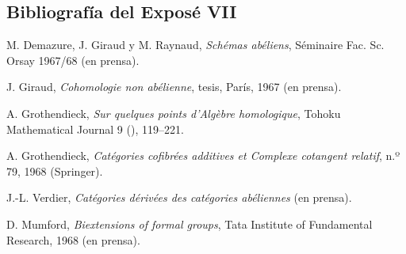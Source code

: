 \subsection*{Bibliografía del Exposé VII}

\begin{enumerate}[label={[\arabic*]}]
\item M. Demazure, J. Giraud y M. Raynaud,
\emph{Schémas abéliens}, Séminaire Fac. Sc. Orsay 1967/68 (en prensa).
\item J. Giraud, \emph{Cohomologie non abélienne}, tesis, París,
1967 (en prensa).
\item A. Grothendieck, \emph{Sur quelques points d'Algèbre
homologique}, Tohoku Mathematical Journal 9 (), 119--221.
\item A. Grothendieck, \emph{Catégories cofibrées additives et
Complexe cotangent relatif},
 n.º 79, 1968
(Springer).
\item J.-L. Verdier, \emph{Catégories dérivées des catégories
abéliennes} (en prensa).
\item D. Mumford, \emph{Biextensions of formal groups}, Tata
Institute of Fundamental Research, 1968 (en prensa).
\end{enumerate}
